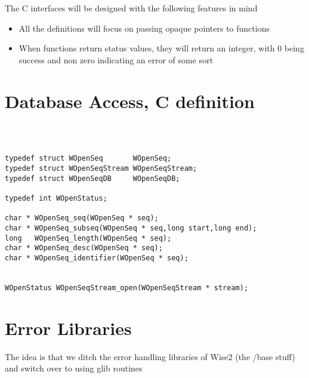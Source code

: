 The C interfaces will be designed with the following features in mind

\begin{itemize}
\item All the definitions will focus on passing opaque pointers to functions
\item When functions return status values, they will return an integer, with
0 being success and non zero indicating an error of some sort
\end{itemize}

\section{Database Access, C definition}

\begin{verbatim}



typedef struct WOpenSeq       WOpenSeq;
typedef struct WOpenSeqStream WOpenSeqStream;
typedef struct WOpenSeqDB     WOpenSeqDB;

typedef int WOpenStatus;

char * WOpenSeq_seq(WOpenSeq * seq);
char * WOpenSeq_subseq(WOpenSeq * seq,long start,long end);
long   WOpenSeq_length(WOpenSeq * seq);
char * WOpenSeq_desc(WOpenSeq * seq);
char * WOpenSeq_identifier(WOpenSeq * seq);


WOpenStatus WOpenSeqStream_open(WOpenSeqStream * stream);

\end{verbatim}


\section{Error Libraries}

The idea is that we ditch the error handling libraries of Wise2 (the /base stuff) and
switch over to using glib routines








